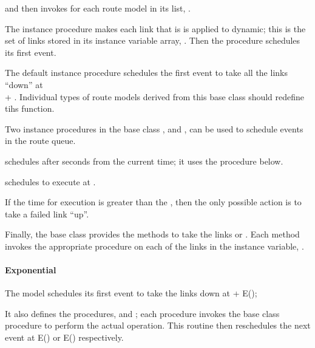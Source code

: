 and then invokes  for each route model in its list,
.
\begin{list}{}{}
\item The instance procedure
  makes each link that is is applied to dynamic;
  this is the set of links stored in its instance variable array,
  .
  Then the procedure schedules its first event.
\item The default instance procedure
  schedules the first event to take all the links ``down'' at \\
   + .
  Individual types of route models derived from this base class should
  redefine tihs function.
\item Two instance procedures in the base class ,
   and
  ,
  can be used to schedule events in the route queue.

   schedules 
  after  seconds from the current time; it uses the
  procedure  below.

   schedules 
  to execute at .

  If the time for execution is greater than the ,
  then the only possible action is to take a failed link ``up''.

\item  Finally, the base class provides the methods to take the links
   or
  .
  Each method invokes the appropriate procedure on each of the links
  in the instance variable, .
\end{list}

\paragraph{Exponential}
The model schedules its first event to take the links down
at  + E();

It also defines the procedures,  and ;
each procedure invokes the base class procedure to perform the actual operation.
This routine then reschedules the next event at
E() or E() respectively.

